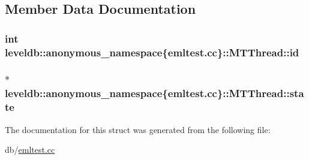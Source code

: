 \subsection{Member Data Documentation}
\hypertarget{structleveldb_1_1anonymous__namespace_02emltest_8cc_03_1_1_m_t_thread_ae864ab2e634be5f2fb741b8a2aed9aba}{}
\subsubsection[{id}]{\setlength{\rightskip}{0pt plus 5cm}int leveldb\+::anonymous\+\_\+namespace\{emltest.\+cc\}\+::M\+T\+Thread\+::id}\label{structleveldb_1_1anonymous__namespace_02emltest_8cc_03_1_1_m_t_thread_ae864ab2e634be5f2fb741b8a2aed9aba}
\hypertarget{structleveldb_1_1anonymous__namespace_02emltest_8cc_03_1_1_m_t_thread_a79b167759c115d81c7b2f9737c794c66}{}
\subsubsection[{state}]{$\ast$ leveldb\+::anonymous\+\_\+namespace\{emltest.\+cc\}\+::M\+T\+Thread\+::state}\label{structleveldb_1_1anonymous__namespace_02emltest_8cc_03_1_1_m_t_thread_a79b167759c115d81c7b2f9737c794c66}


The documentation for this struct was generated from the following file\+:\begin{DoxyCompactItemize}
\item 
db/\hyperlink{emltest_8cc}{emltest.\+cc}\end{DoxyCompactItemize}
